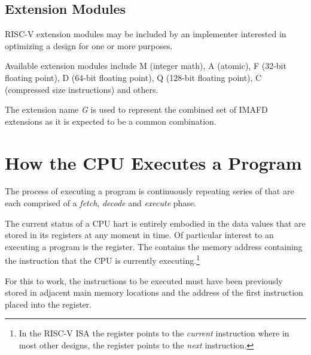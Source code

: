 \subsection{Extension Modules}

RISC-V extension modules may be included by an implementer interested
in optimizing a design for one or more purposes.\cite[p.~4]{rvismv1v22:2017}

%
%
%
%
%
%
Available extension modules include M (integer math), A (atomic),
F (32-bit floating point), D (64-bit floating point), 
Q (128-bit floating point), C (compressed size instructions) and others.

%
The extension name {\em G} is used to represent the combined set of IMAFD
extensions as it is expected to be a common combination.




\section{How the CPU Executes a Program}

The process of executing a program is continuously repeating series of
 that are each comprised
of a {\em fetch}, {\em decode} and {\em execute} phase.
 
The current status of a CPU hart is entirely embodied in the data values that
are stored in its registers at any moment in time.  Of particular interest
to an executing a program is the  register.  The  contains
the memory address containing the instruction that the CPU is currently 
executing.\footnote{In the RISC-V ISA the  register points to the 
{\em current} instruction where in most other designs, the 
register points to the {\em next} instruction.}

For this to work, the instructions to be executed must have been previously 
stored in adjacent main memory locations and the address of the first instruction 
placed into the  register.


